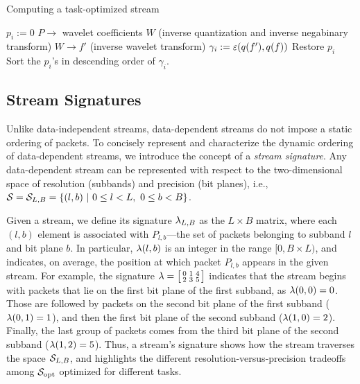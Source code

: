 \begin{algorithm}[h]
  \caption{Computing a task-optimized stream}
  \begin{algorithmic}[1]
			\State $p_i := 0$
      \State $P \rightarrow$ wavelet coefficients $W$ (inverse quantization and inverse negabinary transform)
			\State $W \rightarrow f'$ (inverse wavelet transform)
			\State $\gamma_i := \err(q(f'),q(f))$			
			\State Restore $p_i$
		\EndFor
		\State Sort the $p_i$'s in descending order of $\gamma_i$.
	\end{algorithmic}
	\label{alg:greedy}
\end{algorithm}

\subsection{Stream Signatures} \label{sec:stream-signature}

Unlike data-independent streams, data-dependent streams do not impose a static ordering of packets.
To concisely represent and characterize the dynamic ordering of data-dependent streams, we introduce
the concept of a \emph{stream signature}.  Any data-dependent stream can be represented with respect
to the two-dimensional space of resolution (subbands) and precision (bit planes), i.e., \mbox{$\strm
= \strm_{L,B}=\{(l,b)\ |\ 0\leq l < L,\ 0\leq b < B\}$.}

Given a stream, we define its signature $\sgn_{L,B}$ as the $L \times B$ matrix, where each $(l,b)$
element is associated with $P_{l,b}$---the set of packets belonging to subband $l$ and bit plane
$b$. In particular, $\sgn(l,b)$ is an integer in the range $[0, B\times L)$, and indicates, on
average, the position at which packet $P_{l,b}$ appears in the given stream. For example, the
signature $\sgn=\bigl[ \begin{smallmatrix}0 & 1 & 4\\ 2 & 3 & 5\end{smallmatrix}\bigr]$ indicates
that the stream begins with packets that lie on the first bit plane of the first subband, as
$\sgn(0,0)=0$. Those are followed by packets on the second bit plane of the first subband
($\sgn(0,1)=1$), and then the first bit plane of the second subband ($\sgn(1,0)=2$). Finally, the
last group of packets comes from the third bit plane of the second subband ($\sgn(1,2)=5$). Thus, a
stream's signature shows how the stream traverses the space $\strm_{L,B}$, and highlights the
different resolution-versus-precision tradeoffs among $\sopt$ optimized for different tasks.

